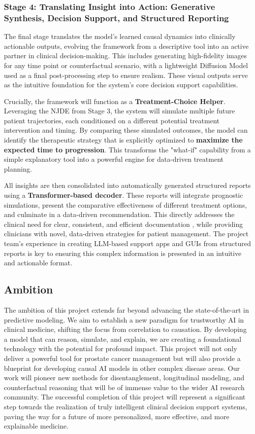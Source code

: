 \documentclass[11pt, a4paper]{article}
\begin{document}
\subsubsection{Stage 4: Translating Insight into Action: Generative Synthesis, Decision Support, and Structured Reporting}
The final stage translates the model's learned causal dynamics into clinically actionable outputs, evolving the framework from a descriptive tool into an active partner in clinical decision-making. This includes generating high-fidelity images for any time point or counterfactual scenario, with a lightweight Diffusion Model used as a final post-processing step to ensure realism. These visual outputs serve as the intuitive foundation for the system's core decision support capabilities.

Crucially, the framework will function as a \textbf{Treatment-Choice Helper}. Leveraging the NJDE from Stage 3, the system will simulate multiple future patient trajectories, each conditioned on a different potential treatment intervention and timing. By comparing these simulated outcomes, the model can identify the therapeutic strategy that is explicitly optimized to \textbf{maximize the expected time to progression}. This transforms the "what-if" capability from a simple explanatory tool into a powerful engine for data-driven treatment planning.

All insights are then consolidated into automatically generated structured reports using a \textbf{Transformer-based decoder}. These reports will integrate prognostic simulations, present the comparative effectiveness of different treatment options, and culminate in a data-driven recommendation. This directly addresses the clinical need for clear, consistent, and efficient documentation \cite{JorgHalfmann2023, SacoranskyKwan2024}, while providing clinicians with novel, data-driven strategies for patient management. The project team's experience in creating LLM-based support apps and GUIs from structured reports is key to ensuring this complex information is presented in an intuitive and actionable format.

\subsection{Ambition}
The ambition of this project extends far beyond advancing the state-of-the-art in predictive modeling. We aim to establish a new paradigm for trustworthy AI in clinical medicine, shifting the focus from correlation to causation. By developing a model that can reason, simulate, and explain, we are creating a foundational technology with the potential for profound impact. This project will not only deliver a powerful tool for prostate cancer management but will also provide a blueprint for developing causal AI models in other complex disease areas. Our work will pioneer new methods for disentanglement, longitudinal modeling, and counterfactual reasoning that will be of immense value to the wider AI research community. The successful completion of this project will represent a significant step towards the realization of truly intelligent clinical decision support systems, paving the way for a future of more personalized, more effective, and more explainable medicine.
\end{document}
